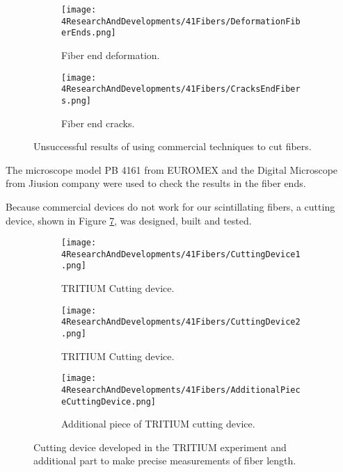 \begin{figure}
\centering
    \begin{subfigure}[b]{0.5\textwidth}
    \centering
    \texttt{[image: 4ResearchAndDevelopments/41Fibers/DeformationFiberEnds.png]}  
    \caption{Fiber end deformation.\label{subfig:FiberEndDeformation}}
    \end{subfigure}
    \hfill
    \begin{subfigure}[b]{0.45\textwidth}
    \centering
    \texttt{[image: 4ResearchAndDevelopments/41Fibers/CracksEndFibers.png]}  
    \caption{Fiber end cracks.\label{subfig:FiberEndCracks}}
    \end{subfigure}
 \caption{Unsuccessful results of using commercial techniques to cut fibers.}
 \label{fig:BadCutsOfFibers}
\end{figure}

The microscope model PB 4161 from EUROMEX and the Digital Microscope from Jiusion company were used to check the results in the fiber ends. 

Because commercial devices do not work for our scintillating fibers, a cutting device, shown in Figure \ref{fig:CuttingTRITIUMDevice}, was designed, built and tested.

\begin{figure}
\centering
    \begin{subfigure}[b]{0.4\textwidth}
    \centering
    \texttt{[image: 4ResearchAndDevelopments/41Fibers/CuttingDevice1.png]}  
    \caption{TRITIUM Cutting device.\label{subfig:CuttingDevice1}}
    \end{subfigure}
    \hfill
    \begin{subfigure}[b]{0.55\textwidth}
    \centering
    \texttt{[image: 4ResearchAndDevelopments/41Fibers/CuttingDevice2.png]}  
    \caption{TRITIUM Cutting device.\label{subfig:CuttingDevice2}}
    \end{subfigure}
    \hfill
    \begin{subfigure}[b]{0.6\textwidth}
    \centering
    \texttt{[image: 4ResearchAndDevelopments/41Fibers/AdditionalPieceCuttingDevice.png]}  
    \caption{Additional piece of TRITIUM cutting device.\label{subfig:AdditionalPieceCuttingDevice}}
    \end{subfigure}
 \caption{Cutting device developed in the TRITIUM experiment and additional part to make precise measurements of fiber length.}
 \label{fig:CuttingTRITIUMDevice}
\end{figure}

